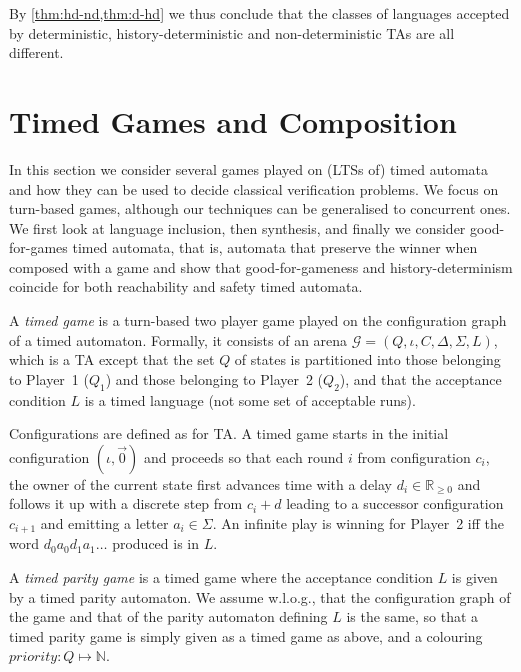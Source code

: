 \documentclass[10pt,a4paper]{amsart}
\theoremstyle{definition}
\numberwithin{equation}{section}
\newcommand{\N}{\mathbb{N}}
\newcommand{\nnreals}{{\mathbb R}_{\geq 0}}
\newcommand{\gsgame}{\mathcal{G}}
\newcommand{\priority}{\mathit{priority}}
\begin{document}
By \cref{thm:hd-nd,thm:d-hd} we thus conclude that the classes of languages accepted by deterministic, history-deterministic and non-deterministic TAs are all different.

	
	\section{Timed Games and Composition}
	\label{sec_games}
	\label{sec:games}

In this section we consider several games played on (LTSs of) timed automata and how they can be used to decide classical verification problems.
We focus on turn-based games, although our techniques can be generalised to concurrent ones. We first look at language inclusion, then synthesis, and finally we consider good-for-games timed automata, that is, automata that preserve the winner when composed with a game and show that good-for-gameness and history-determinism coincide for both reachability and safety timed automata.



\begin{definition} A \emph{timed game} is a turn-based two player
    game played on the configuration graph of a timed automaton.
    Formally, it consists of an arena $\gsgame=(Q,\iota,  C, \Delta,\Sigma,L)$,
    which is a TA except that the set $Q$ of states is partitioned into those belonging to Player~1 ($Q_1$)
    and those belonging to Player~2 ($Q_2$), and that the acceptance condition $L$ is a timed language
    (not some set of acceptable runs).
    
    Configurations are defined as for TA. %
    A timed game starts in the initial configuration $(\iota,\vec{0})$ and proceeds so that each round $i$ from configuration $c_i$, 
the owner of the current state first advances time with a delay $d_i\in \nnreals$
and follows it up with a discrete step from $c_i+d$ leading to a successor configuration $c_{i+1}$ and emitting a letter $a_i\in\Sigma$.
An infinite play is winning for Player~2 iff the word $d_0a_0d_1a_1\dots$ produced is in $L$. %

A \emph{timed parity game} is a timed game where the acceptance condition $L$ is given by a timed parity automaton. We assume w.l.o.g., that the configuration graph of the game and that of the parity automaton defining $L$ is the same, so that a timed parity game is simply given as a timed game as above, and a colouring $\priority:Q\mapsto\N$.
\end{definition}
\end{document}
